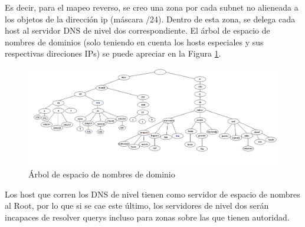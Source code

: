 \indent Es decir, para el mapeo reverso, se creo una zona por cada subnet no alieneada a los objetos de la dirección ip (máscara /24). 
Dentro de esta zona, se delega cada host al servidor DNS de nivel dos correspondiente. El árbol de espacio de nombres de dominios 
(solo teniendo en cuenta los hosts especiales y sus respectivas direciones IPs) se puede apreciar en la Figura \ref{dns002}. \\

\begin{figure}[!htpb]
      \centering
      \begin{center}
      \includegraphics[width=20cm, angle=90]{Imagenes/dns2.png}
      \end{center}
      \caption{Árbol de espacio de nombres de dominio}
      \label{dns002}
\end{figure}


\indent Los host que corren los DNS de nivel tienen como servidor de espacio de nombres al Root, por lo que si se cae este último, los servidores de 
nivel dos serán incapaces de resolver querys incluso para zonas sobre las que tienen autoridad. \\ 

